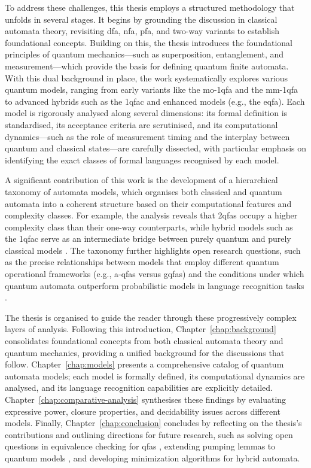To address these challenges, this thesis employs a structured methodology that unfolds in several stages. It begins by grounding the discussion in classical automata theory, revisiting \gls{dfa}, \gls{nfa}, \gls{pfa}, and two-way variants to establish foundational concepts. Building on this, the thesis introduces the foundational principles of quantum mechanics---such as superposition, entanglement, and measurement---which provide the basis for defining quantum finite automata. With this dual background in place, the work systematically explores various quantum models, ranging from early variants like the \gls{mo-1qfa} \cite{moore2000quantum} and the \gls{mm-1qfa} \cite{kondacs1997power} to advanced hybrids such as the \gls{1qfac} and enhanced models (e.g., the \gls{eqfa}). Each model is rigorously analysed along several dimensions: its formal definition is standardised, its acceptance criteria are scrutinised, and its computational dynamics—such as the role of measurement timing and the interplay between quantum and classical states---are carefully dissected, with particular emphasis on identifying the exact classes of formal languages recognised by each model.

A significant contribution of this work is the development of a hierarchical taxonomy of automata models, which organises both classical and quantum automata into a coherent structure based on their computational features and complexity classes. For example, the analysis reveals that \glspl{2qfa} occupy a higher complexity class than their one-way counterparts, while hybrid models such as the \gls{1qfac} serve as an intermediate bridge between purely quantum and purely classical models \cite{yakaryilmaz2010succinctness}. The taxonomy further highlights open research questions, such as the precise relationships between models that employ different quantum operational frameworks (e.g., \glspl{a-qfa} versus \glspl{gqfa}) and the conditions under which quantum automata outperform probabilistic models in language recognition tasks \cite{hirvensalo2012quantum}.

The thesis is organised to guide the reader through these progressively complex layers of analysis. Following this introduction, Chapter~\ref{chap:background} consolidates foundational concepts from both classical automata theory and quantum mechanics, providing a unified background for the discussions that follow. Chapter~\ref{chap:models} presents a comprehensive catalog of quantum automata models; each model is formally defined, its computational dynamics are analysed, and its language recognition capabilities are explicitly detailed. Chapter~\ref{chap:comparative-analysis} synthesises these findings by evaluating expressive power, closure properties, and decidability issues across different models. Finally, Chapter~\ref{chap:conclusion} concludes by reflecting on the thesis’s contributions and outlining directions for future research, such as solving open questions in equivalence checking for \glspl{qfa} \cite{li2012characterizations}, extending pumping lemmas to quantum models \cite{ambainis1998one}, and developing minimization algorithms for hybrid automata.

